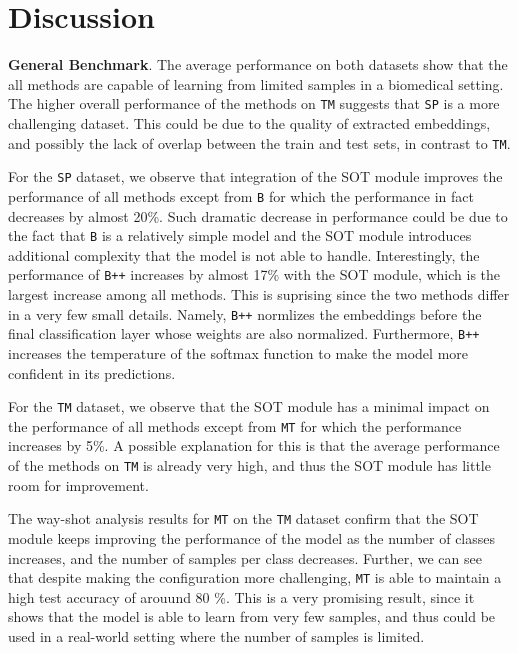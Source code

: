 \section{Discussion}

\textbf{General Benchmark}. The average performance on both datasets show that the all methods are capable of learning from limited samples
in a biomedical setting. The higher overall performance of the methods on \texttt{TM} 
suggests that \texttt{SP} is a more challenging dataset. This could be due to the quality of extracted 
embeddings, and possibly the lack of overlap between the train and test sets, in contrast to \texttt{TM}.


For the \texttt{SP} dataset, we observe that integration of the SOT module improves the performance of all methods
except from \texttt{B} for which the performance in fact decreases by almost 20\%. Such dramatic decrease in performance
could be due to the fact that \texttt{B} is a relatively simple model and the SOT module introduces additional complexity
that the model is not able to handle. Interestingly, the performance of \texttt{B++} increases by almost 17\% with the SOT module,
which is the largest increase among all methods. This is suprising since the two methods differ in a very few small details.
Namely, \texttt{B++} normlizes the embeddings before the final classification layer whose weights are also normalized. Furthermore,
\texttt{B++} increases the temperature of the softmax function to make the model more confident in its predictions.

For the \texttt{TM} dataset, we observe that the SOT module has a minimal impact on the performance of all methods
except from \texttt{MT} for which the performance increases by 5\%. A possible explanation for this is that the
average performance of the methods on \texttt{TM} is already very high, and thus the SOT module has little room
for improvement. 

The way-shot analysis results for \texttt{MT} on the \texttt{TM} dataset confirm that the SOT module keeps
improving the performance of the model as the number of classes increases, and the number of samples per class decreases.
Further, we can see that despite making the configuration more challenging, \texttt{MT} is able to 
maintain a high test accuracy of arouund 80 \%. This is a very promising result, since it shows that the model
is able to learn from very few samples, and thus could be used in a real-world setting where the number of samples
is limited.


